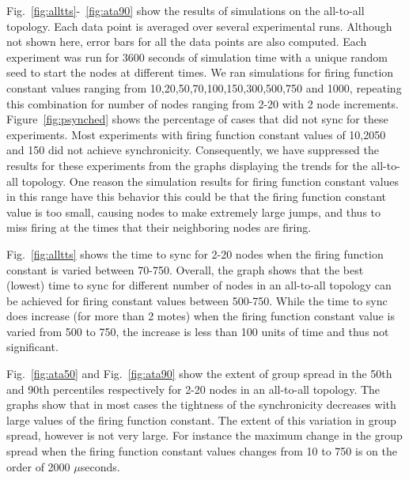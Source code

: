 Fig.~\ref{fig:alltts}-~\ref{fig:ata90} show the results of simulations on the all-to-all topology.
Each data point is averaged over several experimental runs. Although not shown here, error bars
for all the data points are also computed. Each experiment was run for 3600 seconds of 
simulation time with a unique random seed to start the nodes at different times.
We ran simulations for firing function constant values ranging from 10,20,50,70,100,150,300,500,750 and
1000, repeating this combination for number of nodes ranging from 2-20 with 2 node increments. 
Figure~\ref{fig:psynched} shows the percentage of cases that did not sync for these experiments.
Most experiments with firing function constant values of 10,2050 and 150 did not achieve
synchronicity. Consequently, we have suppressed the results for these experiments from the graphs
displaying the trends for the all-to-all topology.
One reason the simulation results for firing
function constant values in this range have this behavior this could be that the firing 
function constant value is too small, causing nodes to make extremely large jumps, and 
thus to miss firing at the times that their neighboring nodes are firing.

Fig.~\ref{fig:alltts} shows the time to sync for 2-20 nodes when the firing function 
constant is varied between 70-750.
Overall, the graph shows that the best (lowest) time to sync for different number
of nodes in an all-to-all topology can be achieved for firing constant values between 500-750.
While the time to sync does increase (for more than 2 motes) when the firing function constant value is varied from
500 to 750, the increase is less than 100 units of time and thus not significant.

Fig.~\ref{fig:ata50} and Fig.~\ref{fig:ata90} show the extent of group spread 
in the 50th and 90th percentiles respectively for 2-20 nodes in an all-to-all 
topology. The graphs show that in most cases the tightness of the synchronicity decreases
with large values of the firing function constant.  The extent of this variation
in group spread, however is not very large. For instance the maximum change in the
group spread when the firing function constant values changes from 10 to 750 is
on the order of 2000 $\mu$seconds.

